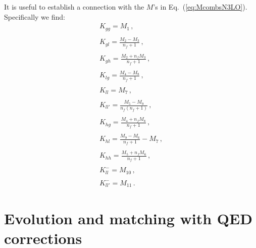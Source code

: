 \documentclass[10pt,a4paper]{article}
\begin{document}
It is useful to establish a connection with the $M$'s in
Eq.~(\ref{eq:McombsN3LO}). Specifically we find:
\begin{equation}
\begin{array}{l}
\displaystyle K_{gg} = M_1\,,\\
\\
\displaystyle K_{gl} =\frac{M_2-M_3}{n_f+1}\,,\\
\\
\displaystyle K_{gh} =\frac{M_2+n_fM_3}{n_f+1}\,,\\
\\
\displaystyle K_{lg} =\frac{M_4-M_8}{n_f+1}\,,\\
\\
\displaystyle K_{ll}=M_7\,,\\
\\
\displaystyle K_{ll'}=\frac{M_5-M_9}{n_f(n_f+1)}\,,\\
\\
\displaystyle K_{hg}=\frac{M_4+n_fM_8}{n_f+1}\,,\\
\\
\displaystyle K_{hl} =\frac{M_9-M_6}{n_f+1}-M_7\,,\\
\\
\displaystyle K_{hh}=\frac{M_5+n_fM_6}{n_f+1}\,,\\
\\
\displaystyle K_{ll}^-=M_{10}\,,\\
\\
\displaystyle K_{ll'}^-=M_{11}\,.
\end{array}
\end{equation}

\section{Evolution and matching with QED corrections}
\end{document}
